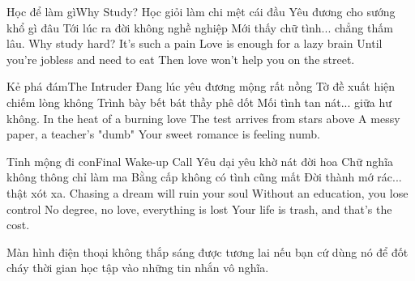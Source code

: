 \begin{tutuyetbox}{Học để làm gì}{Why Study?}
Học giỏi làm chi mệt cái đầu
Yêu đương cho sướng khổ gì đâu
Tới lúc ra đời không nghề nghiệp
Mới thấy chữ tình... chẳng thấm lâu.
\tcblower
Why study hard? It's such a pain
Love is enough for a lazy brain
Until you're jobless and need to eat
Then love won't help you on the street.
\end{tutuyetbox}

\begin{tutuyetbox}{Kẻ phá đám}{The Intruder}
Đang lúc yêu đương mộng rất nồng
Tờ đề xuất hiện chiếm lòng không
Trình bày bết bát thầy phê dốt
Mối tình tan nát... giữa hư không.
\tcblower
In the heat of a burning love
The test arrives from stars above
A messy paper, a teacher's "dumb"
Your sweet romance is feeling numb.
\end{tutuyetbox}

\begin{tutuyetbox}{Tỉnh mộng đi con}{Final Wake-up Call}
Yêu dại yêu khờ nát đời hoa
Chữ nghĩa không thông chỉ làm ma
Bằng cấp không có tình cũng mất
Đời thành mớ rác... thật xót xa.
\tcblower
Chasing a dream will ruin your soul
Without an education, you lose control
No degree, no love, everything is lost
Your life is trash, and that's the cost.
\end{tutuyetbox}

\begin{ghichu}
Màn hình điện thoại không thắp sáng được tương lai nếu bạn cứ dùng nó để đốt cháy thời gian học tập vào những tin nhắn vô nghĩa.
\end{ghichu}